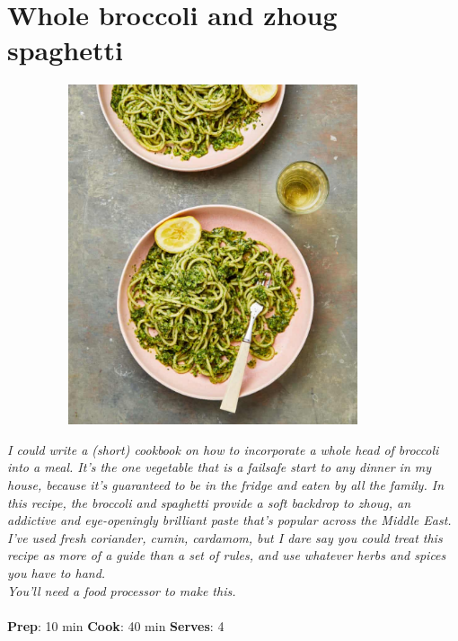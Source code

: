 \documentclass{book}
\begin{document}
\section{Whole broccoli and zhoug spaghetti}
\begin{figure}
\centering\includegraphics[width=10cm,height=10cm,keepaspectratio]{Recipe_Pictures/Whole_broccoli_and_zhoug_spaghetti.png}
\end{figure}
\emph{I could write a (short) cookbook on how to incorporate a whole head of broccoli into a meal. It’s the one vegetable that is a failsafe start to any dinner in my house, because it’s guaranteed to be in the fridge and eaten by all the family. In this recipe, the broccoli and spaghetti provide a soft backdrop to zhoug, an addictive and eye-openingly brilliant paste that’s popular across the Middle East. I’ve used fresh coriander, cumin, cardamom, but I dare say you could treat this recipe as more of a guide than a set of rules, and use whatever herbs and spices you have to hand.\\ 
You’ll need a food processor to make this.}\\\\ 
\textbf{Prep}: 10 min
\textbf{Cook}: 40 min
\textbf{Serves}: 4
\end{document}
